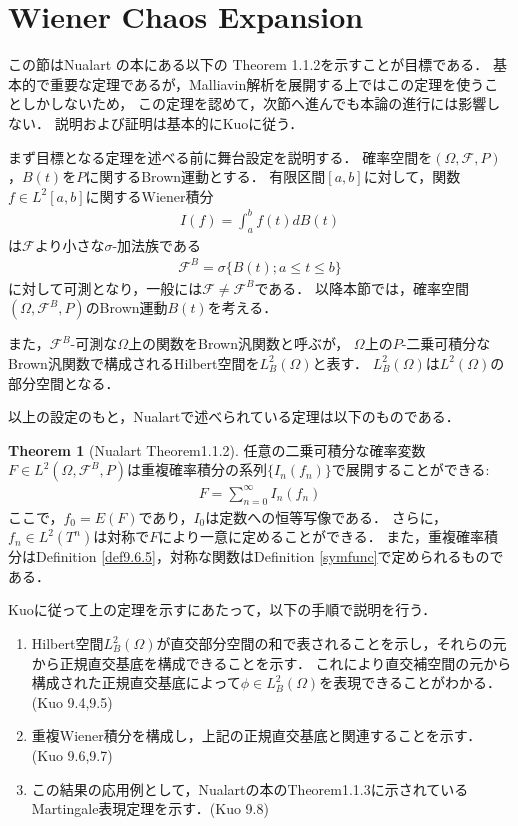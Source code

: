 \documentclass[a4paper,10pt]{jsarticle}
\theoremstyle{definition}
\newtheorem{theorem}{Theorem}
\newcommand{\eq}[1]{\begin{align}#1\end{align}}
\newcommand{\enums}[1]{\begin{enumerate}#1\end{enumerate}}
\begin{document}
\section{Wiener Chaos Expansion}
この節はNualart\cite{Nualart2006} の本にある以下の Theorem 1.1.2を示すことが目標である．
基本的で重要な定理であるが，Malliavin解析を展開する上ではこの定理を使うことしかしないため，
この定理を認めて，次節へ進んでも本論の進行には影響しない．
説明および証明は基本的にKuo\cite{Kuo2006}に従う．

まず目標となる定理を述べる前に舞台設定を説明する．
確率空間を$(\Omega, \mathcal{F}, P)$，$B(t)$を$P$に関するBrown運動とする．
有限区間$[a, b]$に対して，関数$f\in L^2[a, b]$に関するWiener積分
\eq{I(f)=\int_a^bf(t)dB(t)}
は$\mathcal{F}$より小さな$\sigma$-加法族である
\eq{\mathcal{F}^B=\sigma\{B(t);a\le t\le b\}}
に対して可測となり，一般には$\mathcal{F}\neq\mathcal{F}^B$である．
以降本節では，確率空間$(\Omega, \mathcal{F}^B, P)$のBrown運動$B(t)$を考える．

また，$\mathcal{F}^B$-可測な$\Omega$上の関数をBrown汎関数と呼ぶが，
$\Omega$上の$P$-二乗可積分なBrown汎関数で構成されるHilbert空間を$L^2_B(\Omega)$と表す．
$L^2_B(\Omega)$は$L^2(\Omega)$の部分空間となる．

以上の設定のもと，Nualart\cite{Nualart2006}で述べられている定理は以下のものである．
\begin{theorem}[Nualart\cite{Nulalart2006} Theorem1.1.2]
任意の二乗可積分な確率変数$F\in L^2(\Omega, \mathcal{F}^B, P)$は重複確率積分の系列$\{I_n(f_n)\}$で展開することができる:
\eq{F=\sum_{n=0}^\infty I_n(f_n)}
ここで，$f_0=E(F)$であり，$I_0$は定数への恒等写像である．
さらに，$f_n\in L^2(T^n)$は対称で$F$により一意に定めることができる．
また，重複確率積分はDefinition \ref{def9.6.5}，対称な関数はDefinition \ref{symfunc}で定められるものである．
\end{theorem}

Kuo\cite{Kuo2006}に従って上の定理を示すにあたって，以下の手順で説明を行う．
\enums{
	\item Hilbert空間$L^2_B(\Omega)$が直交部分空間の和で表されることを示し，それらの元から正規直交基底を構成できることを示す．
	これにより直交補空間の元から構成された正規直交基底によって$\phi\in L^2_B(\Omega)$を表現できることがわかる．(Kuo\cite{Kuo2006} 9.4,9.5)
	\item 重複Wiener積分を構成し，上記の正規直交基底と関連することを示す．(Kuo\cite{Kuo2006} 9.6,9.7)
	\item この結果の応用例として，Nualartの本のTheorem1.1.3に示されているMartingale表現定理を示す．(Kuo\cite{Kuo2006} 9.8)
}
\end{document}
